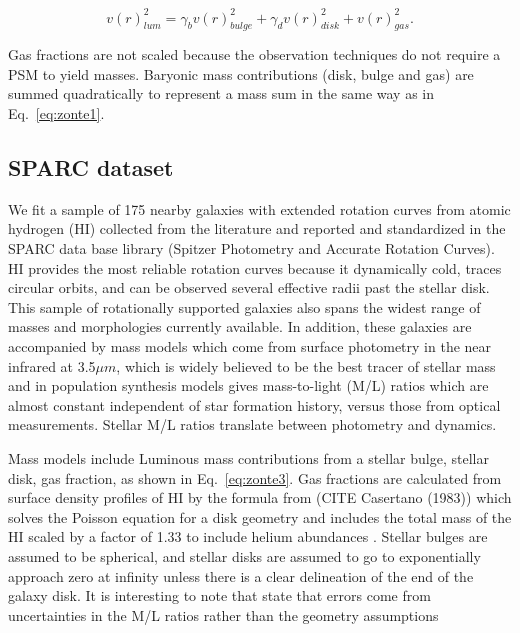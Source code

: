 \documentclass[reprint,%
 amsmath,amssymb,
 aps,
]{revtex4-1}
\begin{document}
  \begin{equation}
v(r)_{lum}^2 = \gamma_b v(r)_{bulge}^2 +  \gamma_d v(r)_{disk}^2 + v(r)_{gas}^2.   
\label{eq:zonte3}
\end{equation} 
 
 
 
  Gas fractions are  not scaled because the observation techniques do not require a PSM to yield masses.  Baryonic mass contributions (disk, bulge and gas) are summed quadratically to represent a mass sum in the same way as in   Eq.~\ref{eq:zonte1}.

\subsection{SPARC dataset}
 
 We fit a sample  of  175 nearby galaxies with extended rotation curves from atomic hydrogen (HI) collected from the literature and reported and standardized in  the SPARC data base library (Spitzer Photometry and Accurate Rotation Curves\cite{2016Lelli}). HI provides the most reliable
 rotation curves because it dynamically cold, traces circular orbits, and can be observed several effective radii past the stellar disk. 
 This sample of rotationally supported galaxies also spans the widest range of masses and morphologies currently available. In addition, these galaxies are  accompanied by mass models which come from surface photometry in the 
   near infrared  at 3.5$\mu m$, which is widely believed to be the best tracer of stellar mass and in population synthesis models  gives mass-to-light (M/L) ratios which are almost constant independent of star formation history,  versus those from   optical measurements\cite{BelldYong,10.1093/mnras/sty3223}.  Stellar M/L ratios   translate between photometry and dynamics. 
   
   Mass models include Luminous mass contributions from a stellar bulge, stellar disk, gas fraction, as shown in Eq.~\ref{eq:zonte3}. Gas fractions are calculated from surface density profiles of HI by the formula from (CITE Casertano (1983)) which solves the Poisson equation for a disk geometry and
   includes the total mass of the HI scaled by a factor of 1.33 to include helium abundances . Stellar bulges are assumed to be spherical, and stellar disks are assumed to go to exponentially approach zero at  infinity unless there is a clear delineation of the end of the galaxy disk. It is interesting to note that \citet{2016Lelli} state that errors come from uncertainties in the M/L ratios rather than the geometry assumptions
   
\end{document}

